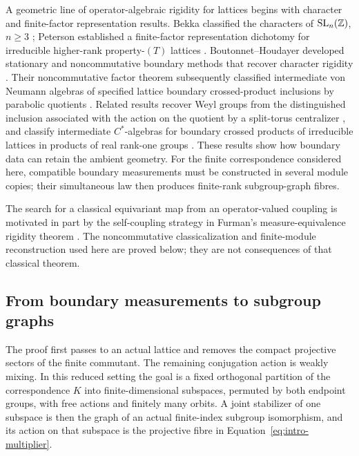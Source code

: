 A geometric line of operator-algebraic rigidity for lattices begins
with character and finite-factor representation results. Bekka
classified the characters of $\operatorname{SL}_n(\mathbb Z)$, $n\geq3$
\cite[Theorem~3]{Bekka2007}; Peterson established a finite-factor
representation dichotomy for irreducible higher-rank property-$(T)$
lattices \cite[Theorem~A]{Peterson2014}.
Boutonnet--Houdayer developed stationary and noncommutative boundary
methods that recover character rigidity
\cite[Theorems~A--C]{BoutonnetHoudayer2021}.
Their noncommutative factor theorem subsequently classified
intermediate von Neumann algebras of specified lattice boundary
crossed-product inclusions by parabolic quotients
\cite[Theorem~B and Theorem~3.3]{BoutonnetHoudayer2023}.
Related results recover Weyl groups from the distinguished inclusion
associated with the action on the quotient by a split-torus centralizer
\cite[Theorem~A and Corollary~B]{HI2026}, and classify intermediate
$C^*$-algebras for boundary crossed products of irreducible lattices in
products of real rank-one groups
\cite[Corollary~B]{HoudayerLeBars2026}.
These results show how boundary data can retain the ambient geometry.
For the finite correspondence considered here, compatible boundary
measurements must be constructed in several module copies; their
simultaneous law then produces finite-rank subgroup-graph fibres.

The search for a classical equivariant map from an operator-valued
coupling is motivated in part by the self-coupling strategy in Furman's
measure-equivalence rigidity theorem \cite[Sections~3--4]{Furman1999}.
The noncommutative classicalization and finite-module reconstruction
used here are proved below; they are not consequences of that classical
theorem.

\subsection{From boundary measurements to subgroup graphs}
The proof first passes to an actual lattice and removes the compact
projective sectors of the finite commutant. The remaining conjugation
action is weakly mixing. In this reduced setting the goal is a fixed
orthogonal partition of the correspondence $K$ into finite-dimensional
subspaces, permuted by both endpoint groups, with free actions and
finitely many orbits. A joint stabilizer of one subspace is then the graph
of an actual finite-index subgroup isomorphism, and its action on that
subspace is the projective fibre in
Equation~\eqref{eq:intro-multiplier}.

